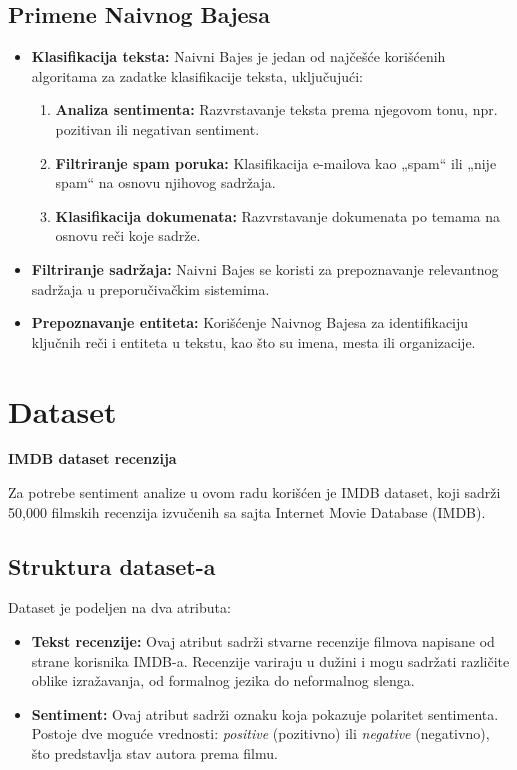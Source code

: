 \documentclass{article}
\begin{document}
\subsection{Primene Naivnog Bajesa}
\begin{itemize}
    \item \textbf{Klasifikacija teksta:} Naivni Bajes je jedan od najčešće korišćenih algoritama za zadatke klasifikacije teksta, uključujući:
        \begin{enumerate}
            \item \textbf{Analiza sentimenta:} Razvrstavanje teksta prema njegovom tonu, npr. pozitivan ili negativan sentiment.
            \item \textbf{Filtriranje spam poruka:} Klasifikacija e-mailova kao „spam“ ili „nije spam“ na osnovu njihovog sadržaja.
            \item \textbf{Klasifikacija dokumenata:} Razvrstavanje dokumenata po temama na osnovu reči koje sadrže.
        \end{enumerate}

    \item \textbf{Filtriranje sadržaja:} Naivni Bajes se koristi za prepoznavanje relevantnog sadržaja u preporučivačkim sistemima.

    \item \textbf{Prepoznavanje entiteta:} Korišćenje Naivnog Bajesa za identifikaciju ključnih reči i entiteta u tekstu, kao što su imena, mesta ili organizacije.
\end{itemize}
\newpage
\section{Dataset}
\textbf{IMDB dataset recenzija}

Za potrebe sentiment analize u ovom radu korišćen je IMDB dataset, koji sadrži 50,000 filmskih recenzija izvučenih sa sajta Internet Movie Database (IMDB). 

\subsection{Struktura dataset-a}

Dataset je podeljen na dva atributa:
\begin{itemize}
    \item \textbf{Tekst recenzije:} Ovaj atribut sadrži stvarne recenzije filmova napisane od strane korisnika IMDB-a. Recenzije variraju u dužini i mogu sadržati različite oblike izražavanja, od formalnog jezika do neformalnog slenga.
    \item \textbf{Sentiment:} Ovaj atribut sadrži oznaku koja pokazuje polaritet sentimenta. Postoje dve moguće vrednosti: \textit{positive} (pozitivno) ili \textit{negative} (negativno), što predstavlja stav autora prema filmu.
\end{itemize}
\end{document}
